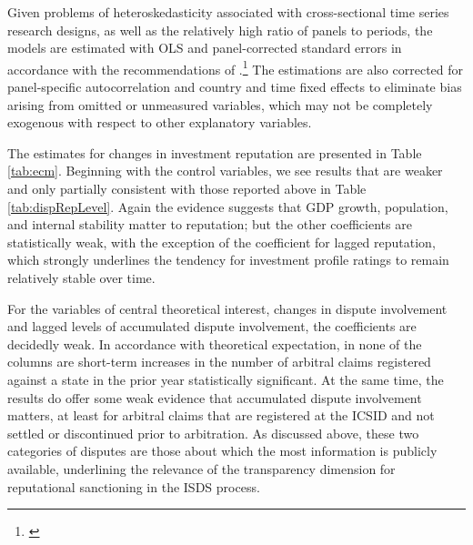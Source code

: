 \documentclass[12pt,onesided]{amsart}
\begin{document}
Given problems of heteroskedasticity associated with cross-sectional time series research designs, as well as the relatively high ratio of panels to periods, the models are estimated with OLS and panel-corrected standard errors in accordance with the recommendations of \citeauthor{beck:katz:1995}.\footnote{\citet{beck:katz:1995}} The estimations are also corrected for panel-specific autocorrelation and country and time fixed effects to eliminate bias arising from omitted or unmeasured variables, which may not be completely exogenous with respect to other explanatory variables.

The estimates for changes in investment reputation are presented in Table \ref{tab:ecm}. Beginning with the control variables, we see results that are weaker and only partially consistent with those reported above in Table \ref{tab:dispRepLevel}. Again the evidence suggests that GDP growth, population, and internal stability matter to reputation; but the other coefficients are statistically weak, with the exception of the coefficient for lagged reputation, which strongly underlines the tendency for investment profile ratings to remain relatively stable over time. 

For the variables of central theoretical interest, changes in dispute involvement and lagged levels of accumulated dispute involvement, the coefficients are decidedly weak. In accordance with theoretical expectation, in none of the columns are short-term increases in the number of arbitral claims registered against a state in the prior year statistically significant. At the same time, the results do offer some weak evidence that accumulated dispute involvement matters, at least for arbitral claims that are registered at the ICSID and not settled or discontinued prior to arbitration. As discussed above, these two categories of disputes are those about which the most information is publicly available, underlining the relevance of the transparency dimension for reputational sanctioning in the ISDS process. 

\end{document}
